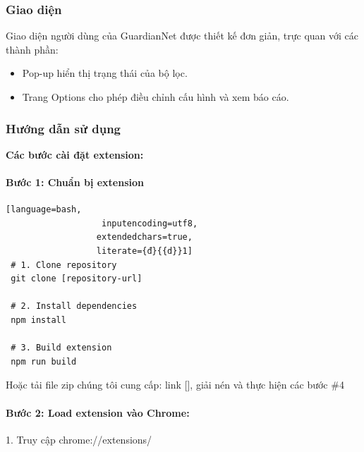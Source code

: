 \documentclass[12pt,a4paper]{article}
\begin{document}
\subsubsection{Giao diện}

Giao diện người dùng của GuardianNet được thiết kế đơn giản, trực quan với các thành phần:
\begin{itemize}
  \item Pop-up hiển thị trạng thái của bộ lọc.
  \item Trang Options cho phép điều chỉnh cấu hình và xem báo cáo.
\end{itemize}

\subsubsection{Hướng dẫn sử dụng}

\textbf{Các bước cài đặt extension:}

\paragraph{Bước 1: Chuẩn bị extension}\mbox{}

\begin{lstlisting}[language=bash,
                   inputencoding=utf8,
                  extendedchars=true,
                  literate={đ}{{d}}1]
 # 1. Clone repository
 git clone [repository-url]
 
 # 2. Install dependencies
 npm install
 
 # 3. Build extension
 npm run build
\end{lstlisting}
                

Hoặc tải file zip chúng tôi cung cấp: link [], giải nén và thực hiện các bước \#4

\paragraph{Bước 2: Load extension vào Chrome:}\mbox{}

1. Truy cập chrome://extensions/
\end{document}
